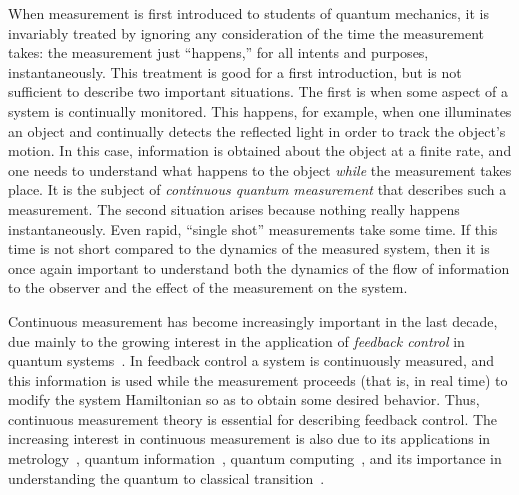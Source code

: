 \documentclass[12pt,aps,onecolum,superscriptaddress,footinbib,floatfix,showpacs]{revtex4-1}
\begin{document}
When measurement is first introduced to students of quantum mechanics,
it is invariably treated by ignoring any consideration of the time the measurement takes:
the measurement just ``happens,'' for all intents and purposes,
instantaneously.  This treatment is good for a first introduction, but
is not sufficient to describe two important situations.  The first is
when some aspect of a system is continually monitored.  
This happens, for example,
when one illuminates an object and continually detects the reflected
light in order to track the object's motion.  In this case, information
is obtained about the object at a finite rate, and one needs to
understand what happens to the object {\em while} the measurement
takes place.  It is the subject of {\em continuous quantum
measurement} that describes such a measurement.  The second situation
arises because nothing really happens instantaneously.  Even
rapid, ``single shot'' measurements take some time.  If this time is
not short compared to the dynamics of the measured system, then it is
once again important to understand both the dynamics of the flow of
information to the observer and the effect of the measurement on the
system.

Continuous measurement has become increasingly important in the last
decade, due mainly to the growing interest in the application of
\textit{feedback control} in quantum
systems~\cite{BelavkinLQG,DJ,Wiseman05,Hopkins03,Steck04,Steixner05,Rabl05,Combes06,Bushev06,DHelon06,Steck06}.  
In feedback control a system is
continuously measured, and this information is used while the
measurement proceeds (that is, in real time) to modify the system
Hamiltonian so as to obtain some desired behavior.  Thus, continuous
measurement theory is essential for describing feedback control.  The
increasing interest in continuous measurement is also due to its
applications in metrology~\cite{Wiseman95,Berry02,Pope04,Stockton04,Geremia05},
quantum information~\cite{Dolinar73,Geremia04,Jacobs07}, quantum
computing~\cite{Ahn02,Sarovar04,Handel06}, and its importance in
understanding the quantum to classical
transition~\cite{Bhattacharya00,Habib02,Bhattacharya03,Ghose04,Ghose05,Everitt05,Habib06}.
\end{document}
